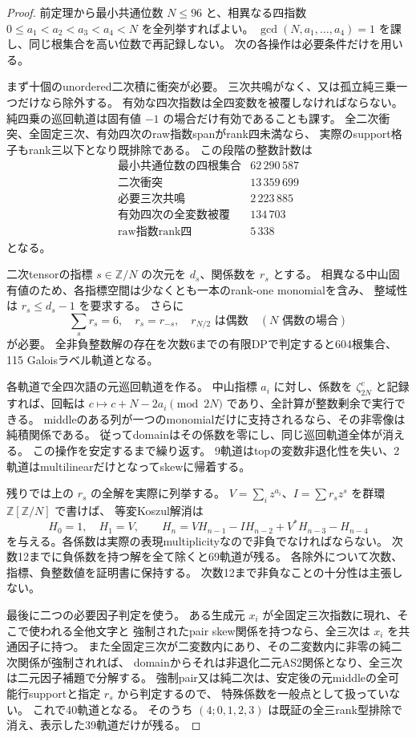 \begin{proof}
前定理から最小共通位数 $N\le96$ と、相異なる四指数
$0\le a_1<a_2<a_3<a_4<N$ を全列挙すればよい。
$\gcd(N,a_1,\ldots,a_4)=1$ を課し、同じ根集合を高い位数で再記録しない。
次の各操作は必要条件だけを用いる。

まず十個のunordered二次積に衝突が必要。
三次共鳴がなく、又は孤立純三乗一つだけなら除外する。
有効な四次指数は全四変数を被覆しなければならない。
純四乗の巡回軌道は固有値 $-1$ の場合だけ有効であることも課す。
全二次衝突、全固定三次、有効四次のraw指数spanがrank四未満なら、
実際のsupport格子もrank三以下となり既排除である。
この段階の整数計数は
\[
\begin{array}{l|r}
 \text{最小共通位数の四根集合}&62\,290\,587\\
 \text{二次衝突}&13\,359\,699\\
 \text{必要三次共鳴}&2\,223\,885\\
 \text{有効四次の全変数被覆}&134\,703\\
 \text{raw指数rank四}&5\,338
\end{array}
\]
となる。

二次tensorの指標 $s\in\mathbb Z/N$ の次元を $d_s$、関係数を $r_s$ とする。
相異なる中山固有値のため、各指標空間は少なくとも一本のrank-one monomialを含み、
整域性は $r_s\le d_s-1$ を要求する。
さらに
\[
 \sum_s r_s=6,\quad r_s=r_{-s},\quad
 r_{N/2}\text{ は偶数}\quad(N\text{ 偶数の場合})
\]
が必要。
全非負整数解の存在を次数6までの有限DPで判定すると604根集合、115 Galoisラベル軌道となる。

各軌道で全四次語の元巡回軌道を作る。
中山指標 $a_i$ に対し、係数を $\zeta_{2N}^c$ と記録すれば、回転は
$c\mapsto c+N-2a_i\pmod{2N}$ であり、全計算が整数剰余で実行できる。
middleのある列が一つのmonomialだけに支持されるなら、その非零像は純積関係である。
従ってdomainはその係数を零にし、同じ巡回軌道全体が消える。
この操作を安定するまで繰り返す。
9軌道はtopの変数非退化性を失い、2軌道はmultilinearだけとなってskewに帰着する。

残りでは上の $r_s$ の全解を実際に列挙する。
$V=\sum_i z^{a_i}$、$I=\sum r_sz^s$ を群環 $\mathbb Z[\mathbb Z/N]$ で書けば、
等変Koszul解消は
\[
 H_0=1,\quad H_1=V,\qquad
 H_n=V H_{n-1}-I H_{n-2}+V^*H_{n-3}-H_{n-4}
\]
を与える。各係数は実際の表現multiplicityなので非負でなければならない。
次数12までに負係数を持つ解を全て除くと69軌道が残る。
各除外について次数、指標、負整数値を証明書に保持する。
次数12まで非負なことの十分性は主張しない。

最後に二つの必要因子判定を使う。
ある生成元 $x_i$ が全固定三次指数に現れ、そこで使われる全他文字と
強制されたpair skew関係を持つなら、全三次は $x_i$ を共通因子に持つ。
また全固定三次が二変数内にあり、その二変数内に非零の純二次関係が強制されれば、
domainからそれは非退化二元AS2関係となり、全三次は二元因子補題で分解する。
強制pair又は純二次は、安定後の元middleの全可能行supportと指定 $r_s$ から判定するので、
特殊係数を一般点として扱っていない。
これで40軌道となる。
そのうち $(4;0,1,2,3)$ は既証の全三rank型排除で消え、表示した39軌道だけが残る。


\end{proof}
